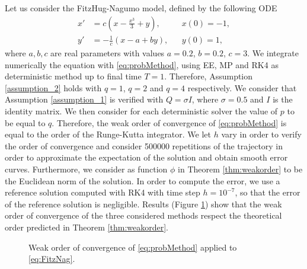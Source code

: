 Let us consider the FitzHug-Nagumo model, defined by the following ODE
\begin{equation}\label{eq:FitzNag}
\begin{aligned}
	x' &= c\left(x - \frac{x^3}{3} + y\right), && x(0) = -1, \\
	y' &= -\frac{1}{c}(x - a + by), && y(0) = 1,
\end{aligned}
\end{equation}
where $a, b, c$ are real parameters with values $a = 0.2$, $b = 0.2$, $c = 3$. We integrate numerically the equation with \eqref{eq:probMethod}, using EE, MP and RK4 as deterministic method up to final time $T = 1$. Therefore, Assumption \ref{assumption_2} holds with $q = 1$, $q = 2$ and $q = 4$ respectively. We consider that Assumption \ref{assumption_1} is verified with $Q = \sigma I$, where $\sigma = 0.5$ and $I$ is the identity matrix. We then consider for each deterministic solver the value of $p$ to be equal to $q$. Therefore, the weak order of convergence of \eqref{eq:probMethod} is equal to the order of the Runge-Kutta integrator. We let $h$ vary in order to verify the order of convergence and consider 500000 repetitions of the trajectory in order to approximate the expectation of the solution and obtain smooth error curves. Furthermore, we consider as function $\phi$ in Theorem \ref{thm:weakorder} to be the Euclidean norm of the solution. In order to compute the error, we use a reference solution computed with RK4 with time step $h = 10^{-7}$, so that the error of the reference solution is negligible. Results (Figure \ref{fig:weakorder}) show that the weak order of convergence of the three considered methods respect the theoretical order predicted in Theorem \ref{thm:weakorder}.

\begin{figure}
\centering
\resizebox{0.6\linewidth}{!}{}
\caption{Weak order of convergence of \eqref{eq:probMethod} applied to \eqref{eq:FitzNag}.}
\label{fig:weakorder}
\end{figure}